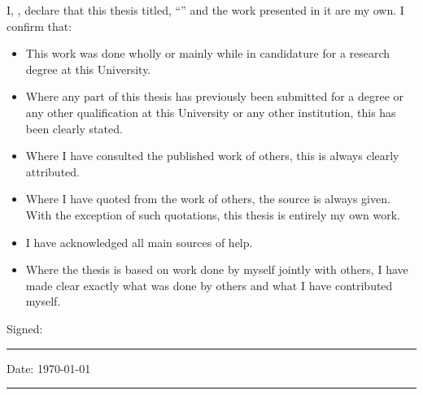 \documentclass[
11pt, %
english, %
onehalfspacing, %
headsepline, %
]{RhodesThesis} %
\theoremstyle{customdefstyle}
\begin{document}
\begin{declaration}
  \addchaptertocentry{\authorshipname} %
  \noindent I, \authorname, declare that this thesis titled, \enquote{\ttitle} and the work presented in it are my own. I confirm that:

  \begin{itemize}
    \item This work was done wholly or mainly while in candidature for a research degree at this University.
    \item Where any part of this thesis has previously been submitted for a degree or any other qualification at this University or any other institution, this has been clearly stated.
    \item Where I have consulted the published work of others, this is always clearly attributed.
    \item Where I have quoted from the work of others, the source is always given. With the exception of such quotations, this thesis is entirely my own work.
    \item I have acknowledged all main sources of help.
    \item Where the thesis is based on work done by myself jointly with others, I have made clear exactly what was done by others and what I have contributed myself.\\
  \end{itemize}

  \noindent Signed: \authorname \\
  \rule[0.5em]{25em}{0.5pt} %

  \noindent Date: \monthyeardate\today\\
  \rule[0.5em]{25em}{0.5pt} %
\end{declaration}

\let\cleardoublepage\clearpage


\vspace*{0.2\textheight}


\end{document}
